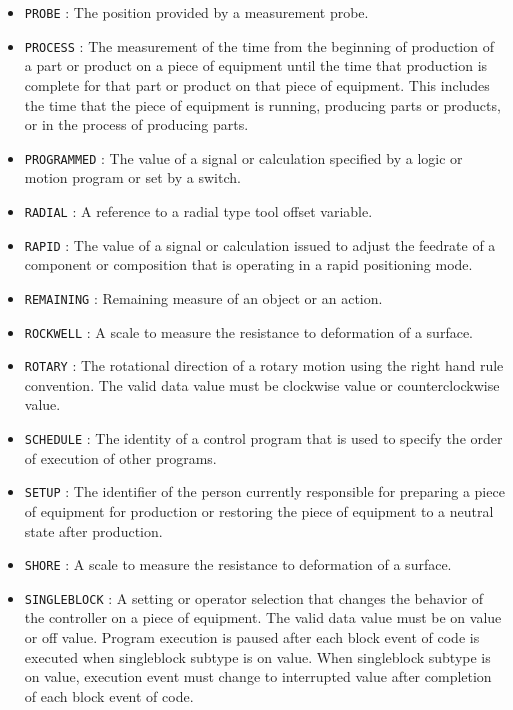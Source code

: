 \begin{itemize}
\item \texttt{PROBE} : The position provided by a measurement probe. 

\item \texttt{PROCESS} : The measurement of the time from the beginning of production of a part or product on a piece of equipment until the time that production is complete for that part or product on that piece of equipment.  This includes the time that the piece of equipment is running, producing parts or products, or in the process of producing parts. 

\item \texttt{PROGRAMMED} : The value of a signal or calculation specified by a logic or motion program or set by a switch. 

\item \texttt{RADIAL} : A reference to a radial type tool offset variable. 

\item \texttt{RAPID} : The value of a signal or calculation issued to adjust the feedrate of a component or composition that is operating in a rapid positioning mode. 

\item \texttt{REMAINING} : Remaining measure of an object or an action. 

\item \texttt{ROCKWELL} : A scale to measure the resistance to deformation of a surface. 

\item \texttt{ROTARY} : The rotational direction of a rotary motion using the right hand rule convention.
 The valid data value must be clockwise value or counterclockwise value. 

\item \texttt{SCHEDULE} : The identity of a control program that is used to specify the order of execution of other programs. 

\item \texttt{SET\textunderscore UP} : The identifier of the person currently responsible for preparing a piece of equipment for production or restoring the piece of equipment to a neutral state after production. 

\item \texttt{SHORE} : A scale to measure the resistance to deformation of a surface. 

\item \texttt{SINGLE\textunderscore BLOCK} : A setting or operator selection that changes the behavior of the controller on a piece of equipment. 
 The valid data value must be on value or off value.
 Program execution is paused after each block event of code is executed when singleblock subtype is on value.   
 When singleblock subtype is on value, execution event must change to interrupted value after completion of each block event of code.  


\end{itemize}
